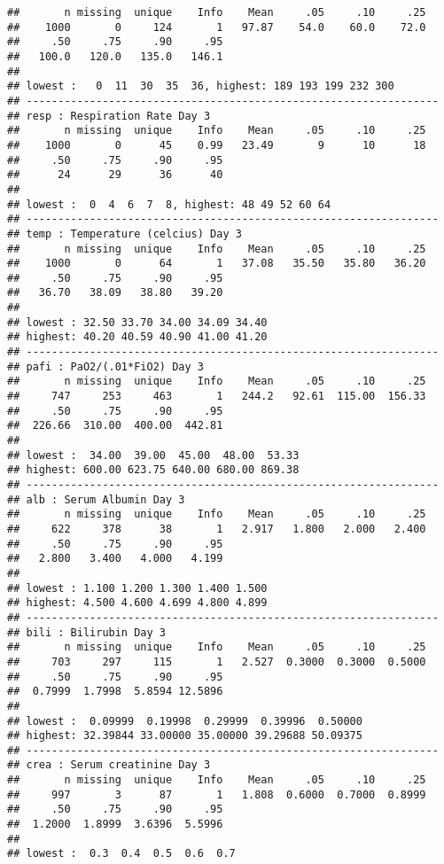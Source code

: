 \documentclass[headinclude=true, headsepline=true, DIV14]{scrartcl}\usepackage[]{graphicx}\usepackage[]{color}
\makeatletter
\newenvironment{kframe}{%
 \def\at@end@of@kframe{}%
 \ifinner\ifhmode%
  \def\at@end@of@kframe{\end{minipage}}%
  \begin{minipage}{\columnwidth}%
 \fi\fi%
 \def\FrameCommand##1{\hskip\@totalleftmargin \hskip-\fboxsep
 \colorbox{shadecolor}{##1}\hskip-\fboxsep
     \hskip-\linewidth \hskip-\@totalleftmargin \hskip\columnwidth}%
 \MakeFramed {\advance\hsize-\width
   \@totalleftmargin\z@ \linewidth\hsize
   \@setminipage}}%
 {\par\unskip\endMakeFramed%
 \at@end@of@kframe}
\newenvironment{knitrout}{}{} %
\makeatother
\begin{document}
\begin{knitrout}
\begin{kframe}
\begin{verbatim}
##       n missing  unique    Info    Mean     .05     .10     .25 
##    1000       0     124       1   97.87    54.0    60.0    72.0 
##     .50     .75     .90     .95 
##   100.0   120.0   135.0   146.1 
## 
## lowest :   0  11  30  35  36, highest: 189 193 199 232 300 
## -----------------------------------------------------------------
## resp : Respiration Rate Day 3 
##       n missing  unique    Info    Mean     .05     .10     .25 
##    1000       0      45    0.99   23.49       9      10      18 
##     .50     .75     .90     .95 
##      24      29      36      40 
## 
## lowest :  0  4  6  7  8, highest: 48 49 52 60 64 
## -----------------------------------------------------------------
## temp : Temperature (celcius) Day 3 
##       n missing  unique    Info    Mean     .05     .10     .25 
##    1000       0      64       1   37.08   35.50   35.80   36.20 
##     .50     .75     .90     .95 
##   36.70   38.09   38.80   39.20 
## 
## lowest : 32.50 33.70 34.00 34.09 34.40
## highest: 40.20 40.59 40.90 41.00 41.20 
## -----------------------------------------------------------------
## pafi : PaO2/(.01*FiO2) Day 3 
##       n missing  unique    Info    Mean     .05     .10     .25 
##     747     253     463       1   244.2   92.61  115.00  156.33 
##     .50     .75     .90     .95 
##  226.66  310.00  400.00  442.81 
## 
## lowest :  34.00  39.00  45.00  48.00  53.33
## highest: 600.00 623.75 640.00 680.00 869.38 
## -----------------------------------------------------------------
## alb : Serum Albumin Day 3 
##       n missing  unique    Info    Mean     .05     .10     .25 
##     622     378      38       1   2.917   1.800   2.000   2.400 
##     .50     .75     .90     .95 
##   2.800   3.400   4.000   4.199 
## 
## lowest : 1.100 1.200 1.300 1.400 1.500
## highest: 4.500 4.600 4.699 4.800 4.899 
## -----------------------------------------------------------------
## bili : Bilirubin Day 3 
##       n missing  unique    Info    Mean     .05     .10     .25 
##     703     297     115       1   2.527  0.3000  0.3000  0.5000 
##     .50     .75     .90     .95 
##  0.7999  1.7998  5.8594 12.5896 
## 
## lowest :  0.09999  0.19998  0.29999  0.39996  0.50000
## highest: 32.39844 33.00000 35.00000 39.29688 50.09375 
## -----------------------------------------------------------------
## crea : Serum creatinine Day 3 
##       n missing  unique    Info    Mean     .05     .10     .25 
##     997       3      87       1   1.808  0.6000  0.7000  0.8999 
##     .50     .75     .90     .95 
##  1.2000  1.8999  3.6396  5.5996 
## 
## lowest :  0.3  0.4  0.5  0.6  0.7

\end{verbatim}
\end{kframe}
\end{knitrout}
\end{document}

